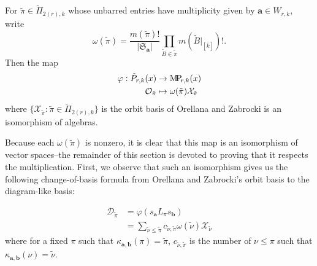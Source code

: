\documentclass[ALCO,Unicode,published]{cedram}
\newcommand{\XX}{\mathcal{X}}
\newcommand{\OO}{\mathcal{O}}
\newcommand{\DD}{\mathcal{D}}
\newcommand{\SG}{\mathfrak{S}}
\newcommand{\bfa}{{\boldsymbol{a}}}
\newcommand{\bfb}{{\boldsymbol{b}}}
\newcommand{\MP}{{\rm M\!P\!}}
\newcommand{\tpi}{{\tilde{\pi}}}
\newcommand{\tnu}{{\tilde{\nu}}}
\newcommand{\tB}{{\tilde{B}}}
\newcommand{\ov}[1]{\bar{#1}}
\newcommand{\ovb}[1]{\left[\ov{#1}\right]}
\newcommand{\abs}[1]{\left| #1\right |}
\begin{document}
\begin{theorem}\label{thm:change_of_basis} For $\tpi\in\tilde\Pi_{2(r),k}$ whose unbarred entries have multiplicity given by $\bfa\in W_{r,k}$, write \[\omega(\tpi)=\frac{m(\tpi)!}{\abs{\SG_\bfa}}\prod_{\tB\in\tpi}m(\tB|_{\ovb{k}})!.\] Then the map \begin{align*}
    \varphi:\tilde{P}_{r,k}(x)&\to\MP_{r,k}(x)\\
    \OO_\tpi&\mapsto \omega(\tpi)\XX_\tpi
\end{align*} where $\{\XX_\tpi:\tpi\in\tilde\Pi_{2(r),k}\}$ is the orbit basis of Orellana and Zabrocki is an isomorphism of algebras.
\end{theorem}

Because each $\omega(\tpi)$ is nonzero, it is clear that this map is an isomorphism of vector spaces--the remainder of this section is devoted to proving that it respects the multiplication. First, we observe that such an isomorphism gives us the following change-of-basis formula from Orellana and Zabrocki's orbit basis to the diagram-like basis:

\begin{align*}
    \DD_\tpi&=\varphi(s_\bfa L_\pi s_\bfb)\\
            &=\sum_{\tnu\leq\tpi} c_{\tnu,\tpi}\omega(\tnu)\XX_\tnu
\end{align*} where for a fixed $\pi$ such that $\kappa_{\bfa,\bfb}(\pi)=\tpi$, $c_{\tnu,\tpi}$ is the number of $\nu\leq\pi$ such that $\kappa_{\bfa,\bfb}(\nu)=\tnu$.
\end{document}

